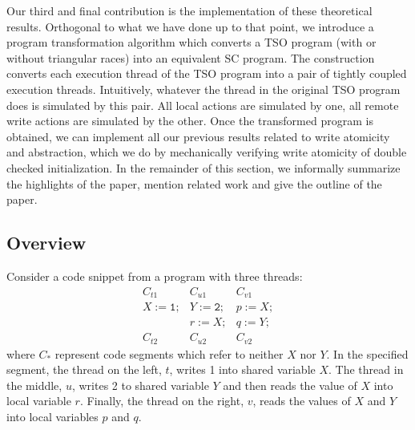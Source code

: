 \documentclass[preprint,9pt]{sigplanconf}
\begin{document}
Our third and final contribution is the implementation of these theoretical results.
Orthogonal to what we have done up to that point, we introduce a program transformation algorithm which converts a TSO program (with or without triangular races) into an equivalent SC program.
The construction converts each execution thread of the TSO program into a pair of tightly coupled execution threads.
Intuitively, whatever the thread in the original TSO program does is simulated by this pair. 
All local actions are simulated by one, all remote write actions are simulated by the other.
Once the transformed program is obtained, we can implement all our previous results related to write atomicity and abstraction, which we do by mechanically verifying write atomicity of double checked initialization.
In the remainder of this section, we informally summarize the highlights of the paper, mention related work and give the outline of the paper.
 
\subsection{Overview}
\label{subsec:overview}
Consider a code snippet from a program with three threads:
{\small
\begin{eqnarray*} 
 C_{t1} &  C_{u1} &  C_{v1}\\
X \mathtt{:= 1;} &  Y\mathtt{:= 2;} &  p\mathtt{:=}X\mathtt{;}\\
& r\mathtt{:= }X\mathtt{;} &  q\mathtt{:=}Y\mathtt{;}\\
C_{t2} & C_{u2} & C_{v2}
\end{eqnarray*}
}
where $C_*$ represent code segments which refer to neither $X$ nor $Y$.
In the specified segment, the thread on the left, $t$, writes 1 into shared variable $X$.
The thread in the middle, $u$, writes 2 to shared variable $Y$ and then reads the value of $X$ into local variable $r$.
Finally, the thread on the right, $v$, reads the values of $X$ and $Y$ into local variables $p$ and $q$.
\end{document}
